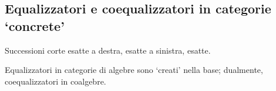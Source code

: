 \subsection{Equalizzatori e coequalizzatori in categorie `concrete'}
\begin{example}\label{ex_eqs_in_grpabmod}
\end{example}
\begin{example}\label{ex_eqs_in_topposptset}
\end{example}
\begin{example}\label{ex_coeqs_in_grpabmod}
\end{example}
\begin{example}\label{ex_coeqs_in_topposptset}
\end{example}
\begin{example}\label{ex_ses_come_universali}
 Successioni corte esatte a destra, esatte a sinistra, esatte.
\end{example}
\begin{proposition}
 Equalizzatori in categorie di algebre sono `creati' nella base; dualmente, coequalizzatori in coalgebre.
\end{proposition}

